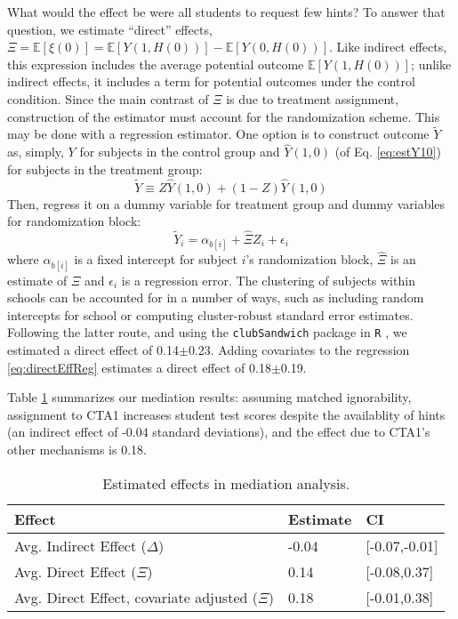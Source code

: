 \documentclass{article}\usepackage[]{graphicx}\usepackage[]{color}
\newcommand{\EE}{\mathbb{E}}
\begin{document}
What would the effect be were all students to request few hints?
To answer that question, we estimate ``direct'' effects,
$\Xi=\EE[\xi(0)]=\EE[Y(1,H(0))]-\EE[Y(0,H(0))]$.
Like indirect effects, this expression includes the average potential
outcome $\EE[Y(1,H(0))]$; unlike indirect effects, it includes a term for
potential outcomes under the control condition.
Since the main contrast of $\Xi$ is due to treatment assignment,
construction of the estimator must account for the randomization
scheme.
This may be done with a regression estimator.
One option is to construct outcome $\tilde{Y}$ as, simply, $Y$ for
subjects in the control group and $\hat{Y}(1,0)$ (of Eq. \ref{eq:estY10}) for subjects in the
treatment group:
\begin{equation*}
\tilde{Y}\equiv Z\hat{Y}(1,0)+(1-Z)\hat{Y}(1,0)
\end{equation*}
Then, regress it on a dummy variable for treatment group and dummy
variables for randomization block:
\begin{equation}\label{eq:directEffReg}
\tilde{Y}_i=\alpha_{b[i]}+\hat{\Xi}Z_i+\epsilon_i
\end{equation}
where $\alpha_{b[i]}$ is a fixed intercept for subject $i$'s randomization block, $\hat{\Xi}$ is an estimate of $\Xi$ and $\epsilon_i$ is a regression error.
The clustering of subjects within schools can be accounted for in a
number of ways, such as including random intercepts for school or
computing cluster-robust standard error estimates.
Following the latter route, and using the \texttt{clubSandwich}
package in \texttt{R} \citep{clubsandwich}, we estimated a direct
effect of
0.14$\pm$0.23.
Adding covariates to the regression \eqref{eq:directEffReg} estimates a direct effect of
0.18$\pm$0.19.

Table \ref{tab:mediation} summarizes our mediation results: assuming matched ignorability, assignment to CTA1 increases student test scores despite the availablity of hints (an indirect effect of -0.04 standard deviations), and the effect due to CTA1's other mechanisms is 0.18.

\begin{table}
\centering
\begin{tabular}{lll}
\hline
Effect&Estimate&CI\\
\hline
Avg. Indirect Effect ($\Delta$)& -0.04 & [-0.07,-0.01] \\
Avg. Direct Effect ($\Xi$)& 0.14 & [-0.08,0.37] \\
Avg. Direct Effect, covariate adjusted ($\Xi$) & 0.18 & [-0.01,0.38] \\

\hline
\end{tabular}
\caption{Estimated effects in mediation analysis. }
\label{tab:mediation}
\end{table}
\end{document}
